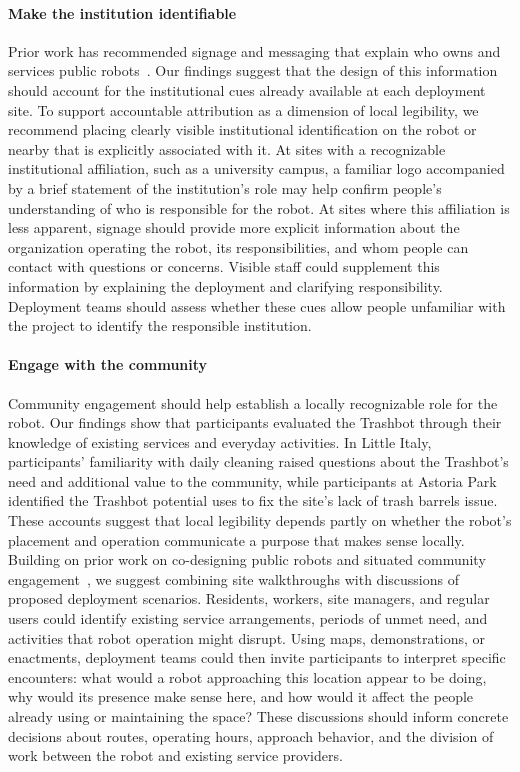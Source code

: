\paragraph{Make the institution identifiable} Prior work has recommended signage and messaging that explain who owns and services public robots~\cite{bu2025making}. Our findings suggest that the design of this information should account for the institutional cues already available at each deployment site. To support accountable attribution as a dimension of local legibility, we recommend placing clearly visible institutional identification on the robot or nearby that is explicitly associated with it. At sites with a recognizable institutional affiliation, such as a university campus, a familiar logo accompanied by a brief statement of the institution's role may help confirm people's understanding of who is responsible for the robot. At sites where this affiliation is less apparent, signage should provide more explicit information about the organization operating the robot, its responsibilities, and whom people can contact with questions or concerns. Visible staff could supplement this information by explaining the deployment and clarifying responsibility. Deployment teams should assess whether these cues allow people unfamiliar with the project to identify the responsible institution.

\paragraph{Engage with the community} 
Community engagement should help establish a locally recognizable role for the robot. Our findings show that participants evaluated the Trashbot through their knowledge of existing services and everyday activities. In Little Italy, participants' familiarity with daily cleaning raised questions about the Trashbot's need and additional value to the community, while participants at Astoria Park identified the Trashbot potential uses to fix the site's lack of trash barrels issue. These accounts suggest that local legibility depends partly on whether the robot's placement and operation communicate a purpose that makes sense locally. Building on prior work on co-designing public robots and situated community engagement~\cite{han2024codesign,yavoayalon2023cxr}, we suggest combining site walkthroughs with discussions of proposed deployment scenarios. Residents, workers, site managers, and regular users could identify existing service arrangements, periods of unmet need, and activities that robot operation might disrupt. Using maps, demonstrations, or enactments, deployment teams could then invite participants to interpret specific encounters: what would a robot approaching this location appear to be doing, why would its presence make sense here, and how would it affect the people already using or maintaining the space? These discussions should inform concrete decisions about routes, operating hours, approach behavior, and the division of work between the robot and existing service providers. 

